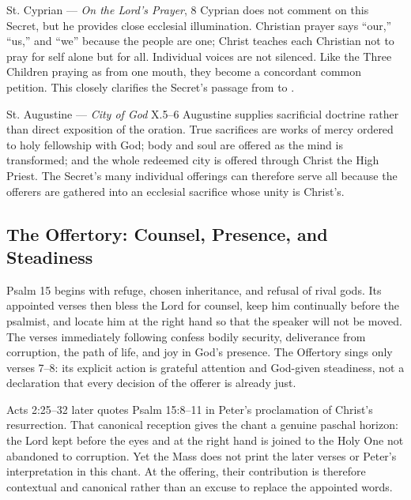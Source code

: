 \begin{deepstudy}
\begin{sourcecard}{St. Cyprian --- \emph{On the Lord's Prayer}, 8}
Cyprian does not comment on this Secret, but he provides close ecclesial illumination. Christian prayer says ``our,'' ``us,'' and ``we'' because the people are one; Christ teaches each Christian not to pray for self alone but for all. Individual voices are not silenced. Like the Three Children praying as from one mouth, they become a concordant common petition. This closely clarifies the Secret's passage from  to .
\end{sourcecard}

\begin{sourcecard}{St. Augustine --- \emph{City of God} X.5--6}
Augustine supplies sacrificial doctrine rather than direct exposition of the oration. True sacrifices are works of mercy ordered to holy fellowship with God; body and soul are offered as the mind is transformed; and the whole redeemed city is offered through Christ the High Priest. The Secret's many individual offerings can therefore serve all because the offerers are gathered into an ecclesial sacrifice whose unity is Christ's.
\end{sourcecard}

\sectionguard
\subsection*{The Offertory: Counsel, Presence, and Steadiness\enspace{}}

Psalm 15 begins with refuge, chosen inheritance, and refusal of rival gods. Its appointed verses then bless the Lord for counsel, keep him continually before the psalmist, and locate him at the right hand so that the speaker will not be moved. The verses immediately following confess bodily security, deliverance from corruption, the path of life, and joy in God's presence. The Offertory sings only verses 7--8: its explicit action is grateful attention and God-given steadiness, not a declaration that every decision of the offerer is already just.

Acts 2:25--32 later quotes Psalm 15:8--11 in Peter's proclamation of Christ's resurrection. That canonical reception gives the chant a genuine paschal horizon: the Lord kept before the eyes and at the right hand is joined to the Holy One not abandoned to corruption. Yet the Mass does not print the later verses or Peter's interpretation in this chant. At the offering, their contribution is therefore contextual and canonical rather than an excuse to replace the appointed words.


\end{deepstudy}
